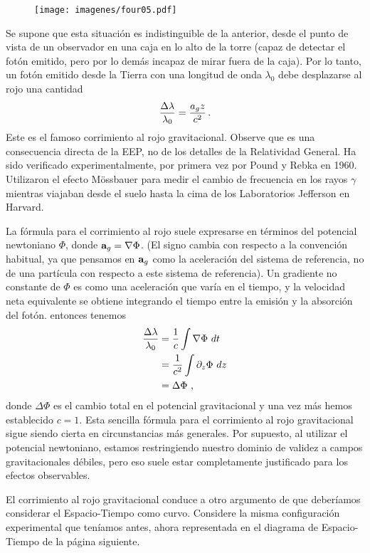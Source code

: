 \documentclass[11pt,b5paper,openany,twoside]{book}
\newcommand{\p}[1]{{\partial_{#1}}}
\begin{document}
\begin{figure}[h]
\centering
\texttt{[image: imagenes/four05.pdf]}
\end{figure}

\noindent
Se supone que esta situación es indistinguible de la anterior, desde el punto de vista de un observador en una caja en lo alto de la torre (capaz de detectar el fotón emitido, pero por lo demás incapaz de mirar fuera de la caja).
Por lo tanto, un fotón emitido desde la Tierra con una longitud de onda $\lambda_0$ debe desplazarse al rojo una cantidad
\begin{equation}
{{\Delta \lambda}\over {\lambda_0}}={{a_gz}\over{c^2}}\,.\label{4.6}
\end{equation}
Este es el famoso corrimiento al rojo gravitacional.
Observe que es una consecuencia directa de la EEP, no de los detalles de la Relatividad General.
Ha sido verificado experimentalmente, por primera vez por Pound y Rebka en 1960.
Utilizaron el efecto Mössbauer para medir el cambio de frecuencia en los rayos $\gamma$ mientras viajaban desde el suelo hasta la cima de los Laboratorios Jefferson en Harvard.

La fórmula para el corrimiento al rojo suele expresarse en términos del potencial newtoniano $\Phi$, donde ${\bf a}_g = \nabla\Phi$.
(El signo cambia con respecto a la convención habitual, ya que pensamos en ${\bf a}_g$ como la aceleración del sistema de referencia, no de una partícula con respecto a este sistema de referencia).
Un gradiente no constante de $\Phi$ es como una aceleración que varía en el tiempo, y la velocidad neta equivalente se obtiene integrando el tiempo entre la emisión y la absorción del fotón.
entonces tenemos
\begin{align}
{{\Delta \lambda}\over {\lambda_0}}  &=
{1\over {c}}\int \nabla\Phi\ dt  \notag \notag \\
&=  {1\over {c^2}}\int \p{z}\Phi\ dz  \notag\notag \\
&=  \Delta\Phi\ , \label{4.7}
\end{align}
donde $\Delta\Phi$ es el cambio total en el potencial gravitacional y una vez más hemos establecido $c=1$.
Esta sencilla fórmula para el corrimiento al rojo gravitacional sigue siendo cierta en circunstancias más generales.
Por supuesto, al utilizar el potencial newtoniano, estamos restringiendo nuestro dominio de validez a campos gravitacionales débiles, pero eso suele estar completamente justificado para los efectos observables.

El corrimiento al rojo gravitacional conduce a otro argumento de que deberíamos considerar el Espacio-Tiempo como curvo.
Considere la misma configuración experimental que teníamos antes, ahora representada en el diagrama de Espacio-Tiempo de la página siguiente.
\end{document}
